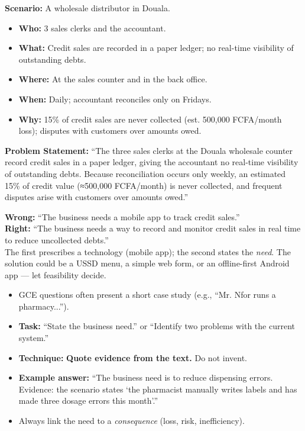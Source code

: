 \documentclass[11pt]{article}
\begin{document}
\begin{exemplebox}
\textbf{Scenario:} A wholesale distributor in Douala.
\begin{itemize}
    \item \textbf{Who:} 3 sales clerks and the accountant.
    \item \textbf{What:} Credit sales are recorded in a paper ledger; no real-time visibility of outstanding debts.
    \item \textbf{Where:} At the sales counter and in the back office.
    \item \textbf{When:} Daily; accountant reconciles only on Fridays.
    \item \textbf{Why:} 15\% of credit sales are never collected (est. 500,000 FCFA/month loss); disputes with customers over amounts owed.
\end{itemize}
\textbf{Problem Statement:}
``The three sales clerks at the Douala wholesale counter record credit sales in a paper ledger, giving the accountant no real-time visibility of outstanding debts. Because reconciliation occurs only weekly, an estimated 15\% of credit value (≈500,000 FCFA/month) is never collected, and frequent disputes arise with customers over amounts owed.''
\end{exemplebox}

\begin{attention}
\textbf{Wrong:} ``The business needs a mobile app to track credit sales.'' \\
\textbf{Right:} ``The business needs a way to record and monitor credit sales in real time to reduce uncollected debts.'' \\
The first prescribes a technology (mobile app); the second states the \emph{need}. The solution could be a USSD menu, a simple web form, or an offline-first Android app — let feasibility decide.
\end{attention}

\begin{aretenir}
\begin{itemize}
    \item GCE questions often present a short case study (e.g., ``Mr. Nfor runs a pharmacy...'').
    \item \textbf{Task:} ``State the business need.'' or ``Identify two problems with the current system.''
    \item \textbf{Technique:} \textbf{Quote evidence from the text.} Do not invent.
    \item \textbf{Example answer:} ``The business need is to reduce dispensing errors. Evidence: the scenario states `the pharmacist manually writes labels and has made three dosage errors this month'.''
    \item Always link the need to a \emph{consequence} (loss, risk, inefficiency).
\end{itemize}
\end{aretenir}
\end{document}
